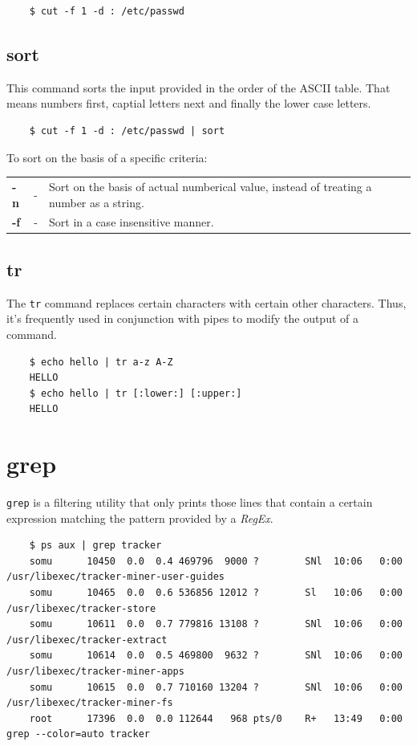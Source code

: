 \documentclass{report}
\begin{document}
	\begin{verbatim}
	$ cut -f 1 -d : /etc/passwd
	\end{verbatim}
	
	\subsection{sort}
	This command sorts the input provided in the order of the ASCII table. That means numbers first, captial letters next and finally the lower case letters. 
	
	\begin{verbatim}
	$ cut -f 1 -d : /etc/passwd | sort
	\end{verbatim}
	
	\noindent
	To sort on the basis of a specific criteria:
	
	\begin{tabular}{lcp{}}
		\textbf{-n} &- &Sort on the basis of actual numberical value, instead of treating a number as a string. \\
		\textbf{-f} &- &Sort in a case insensitive manner. \\
	\end{tabular}

	\subsection{tr}
	The \verb|tr| command replaces certain characters with certain other characters. Thus, it's frequently used in conjunction with pipes to modify the output of a command. 
	
	\begin{verbatim}
	$ echo hello | tr a-z A-Z
	HELLO
	$ echo hello | tr [:lower:] [:upper:]
	HELLO
	\end{verbatim}
	
	\section{grep}
	\verb|grep| is a filtering utility that only prints those lines that contain a certain expression matching the pattern provided by a \textit{RegEx}.
	
	\begin{verbatim}
	$ ps aux | grep tracker
	somu      10450  0.0  0.4 469796  9000 ?        SNl  10:06   0:00 /usr/libexec/tracker-miner-user-guides
	somu      10465  0.0  0.6 536856 12012 ?        Sl   10:06   0:00 /usr/libexec/tracker-store
	somu      10611  0.0  0.7 779816 13108 ?        SNl  10:06   0:00 /usr/libexec/tracker-extract
	somu      10614  0.0  0.5 469800  9632 ?        SNl  10:06   0:00 /usr/libexec/tracker-miner-apps
	somu      10615  0.0  0.7 710160 13204 ?        SNl  10:06   0:00 /usr/libexec/tracker-miner-fs
	root      17396  0.0  0.0 112644   968 pts/0    R+   13:49   0:00 grep --color=auto tracker
	\end{verbatim}
	
\end{document}
